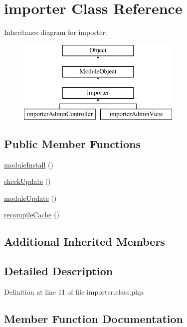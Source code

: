 \hypertarget{classimporter}{}\section{importer Class Reference}
\label{classimporter}
Inheritance diagram for importer\+:\begin{figure}[H]
\begin{center}
\leavevmode
\includegraphics[height=4.000000cm]{classimporter}
\end{center}
\end{figure}
\subsection*{Public Member Functions}
\begin{DoxyCompactItemize}
\item 
\hyperlink{classimporter_a33af57565401adc2b415a3403e7f86f0}{module\+Install} ()
\item 
\hyperlink{classimporter_a314878bedf131686018fcd9a7306a392}{check\+Update} ()
\item 
\hyperlink{classimporter_affadc5d8acbfc67adbd423350b1ccb96}{module\+Update} ()
\item 
\hyperlink{classimporter_a14049d84d0d3bb175857fc6e34447954}{recompile\+Cache} ()
\end{DoxyCompactItemize}
\subsection*{Additional Inherited Members}


\subsection{Detailed Description}


Definition at line 11 of file importer.\+class.\+php.



\subsection{Member Function Documentation}
\hypertarget{classimporter_a314878bedf131686018fcd9a7306a392}{}\label{classimporter_a314878bedf131686018fcd9a7306a392} 
